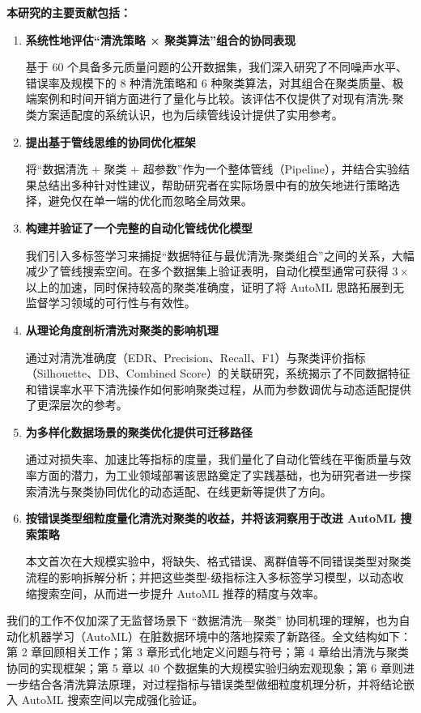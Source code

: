 \documentclass[10pt]{article} %
\numberwithin{equation}{section}
\begin{document}
\textbf{本研究的主要贡献包括：}
\begin{enumerate}
    \item \textbf{系统性地评估“清洗策略 × 聚类算法”组合的协同表现}

    基于 60 个具备多元质量问题的公开数据集，我们深入研究了不同噪声水平、错误率及规模下的 8 种清洗策略和 6 种聚类算法，对其组合在聚类质量、极端案例和时间开销方面进行了量化与比较。该评估不仅提供了对现有清洗-聚类方案适配度的系统认识，也为后续管线设计提供了实用参考。

    \item \textbf{提出基于管线思维的协同优化框架}

    将“数据清洗 + 聚类 + 超参数”作为一个整体管线（Pipeline），并结合实验结果总结出多种针对性建议，帮助研究者在实际场景中有的放矢地进行策略选择，避免仅在单一端的优化而忽略全局效果。

    \item \textbf{构建并验证了一个完整的自动化管线优化模型}

    我们引入多标签学习来捕捉“数据特征与最优清洗-聚类组合”之间的关系，大幅减少了管线搜索空间。在多个数据集上验证表明，自动化模型通常可获得 $3\times$ 以上的加速，同时保持较高的聚类准确度，证明了将 AutoML 思路拓展到无监督学习领域的可行性与有效性。

    \item \textbf{从理论角度剖析清洗对聚类的影响机理}

    通过对清洗准确度（EDR、Precision、Recall、F1）与聚类评价指标（Silhouette、DB、Combined Score）的关联研究，系统揭示了不同数据特征和错误率水平下清洗操作如何影响聚类过程，从而为参数调优与动态适配提供了更深层次的参考。

    \item \textbf{为多样化数据场景的聚类优化提供可迁移路径}

    通过对损失率、加速比等指标的度量，我们量化了自动化管线在平衡质量与效率方面的潜力，为工业领域部署该思路奠定了实践基础，也为研究者进一步探索清洗与聚类协同优化的动态适配、在线更新等提供了方向。

    \item \textbf{按错误类型细粒度量化清洗对聚类的收益，并将该洞察用于改进 AutoML 搜索策略}

    本文首次在大规模实验中，将缺失、格式错误、离群值等不同错误类型对聚类流程的影响拆解分析；并把这些类型-级指标注入多标签学习模型，以动态收缩搜索空间，从而进一步提升 AutoML 推荐的精度与效率。
\end{enumerate}

我们的工作不仅加深了无监督场景下 “数据清洗—聚类” 协同机理的理解，也为自动化机器学习（AutoML）在脏数据环境中的落地探索了新路径。全文结构如下：第 2 章回顾相关工作；第 3 章形式化地定义问题与符号；第 4 章给出清洗与聚类协同的实现框架；第 5 章以 40 个数据集的大规模实验归纳宏观现象；第 6 章则进一步结合各清洗算法原理，对过程指标与错误类型做细粒度机理分析，并将结论嵌入 AutoML 搜索空间以完成强化验证。
\end{document}
